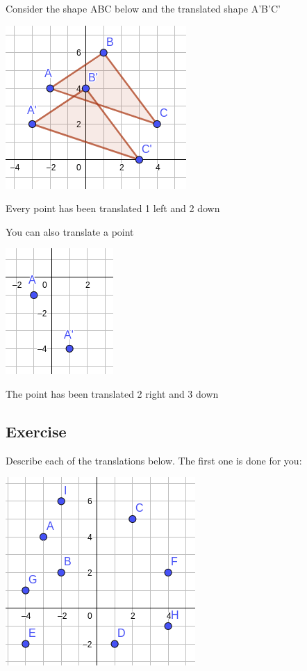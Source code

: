 \begin{exmp}
	Consider the shape ABC below and the translated shape A'B'C'
	\begin{center}
	\includegraphics[scale=0.5]{./Images/Transformations/Trans_eg_2.png}
	\end{center}

	Every point has been translated 1 left and 2 down
\end{exmp}

\begin{exmp}
	You can also translate a point
	\begin{center}
	\includegraphics[scale=0.5]{./Images/Transformations/Trans_eg_3.png}
	\end{center}

	The point has been translated 2 right and 3 down
\end{exmp}

\subsection{Exercise}
Describe each of the translations below.  The first one is done for you:

	\begin{center}
		\includegraphics[scale=0.6]{./Images/Transformations/Trans_ex_1.png}
	\end{center}

